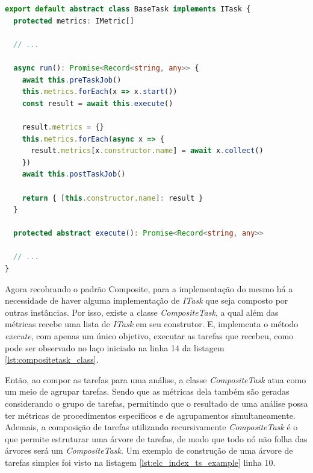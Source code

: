\documentclass[12pt]{tcc}
\begin{document}
\begin{lstlisting}[label={lst:basetask_class}, caption={Fragmento de código da classe abstrata \emph{BaseTask}, implementação do método \emph{run} definido na interface \emph{ITask} \ref{lst:itask}.}, language=TypeScript, breaklines=true]
export default abstract class BaseTask implements ITask {
  protected metrics: IMetric[]

  // ...

  async run(): Promise<Record<string, any>> {
    await this.preTaskJob()
    this.metrics.forEach(x => x.start())
    const result = await this.execute()

    result.metrics = {}
    this.metrics.forEach(async x => {
      result.metrics[x.constructor.name] = await x.collect()
    })
    await this.postTaskJob()

    return { [this.constructor.name]: result }
  }

  protected abstract execute(): Promise<Record<string, any>>

  // ...
}
\end{lstlisting}

	Agora recobrando o padrão Composite, para a implementação do mesmo há a necessidade de haver alguma implementação de \emph{ITask} que seja composto por outras instâncias.
	Por isso, existe a classe \emph{CompositeTask}, a qual além das métricas recebe uma lista de \emph{ITask} em seu construtor.
	E, implementa o método \emph{execute}, com apenas um único objetivo, executar as tarefas que recebeu, como pode ser observado no laço iniciado na linha 14 da listagem \ref{lst:compositetask_class}.

	Então, ao compor as tarefas para uma análise, a classe \emph{CompositeTask} atua como um meio de agrupar tarefas.
	Sendo que as métricas dela também são geradas considerando o grupo de tarefas, permitindo que o resultado de uma análise possa ter métricas de procedimentos específicos e de agrupamentos simultaneamente.
	Ademais, a composição de tarefas utilizando recursivamente \emph{CompositeTask} é o que permite estruturar uma árvore de tarefas, de modo que todo nó não folha das árvores será um \emph{CompositeTask}.
	Um exemplo de construção de uma árvore de tarefas simples foi visto na listagem \ref{lst:elc_index_ts_example} linha 10.
\end{document}
